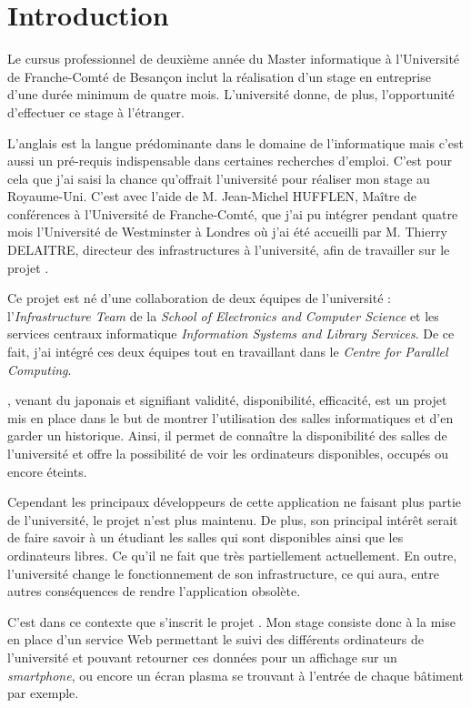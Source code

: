 \chapter{Introduction}

Le cursus professionnel de deuxi\`eme ann\'ee du Master informatique \`a l'Universit\'e de Franche-Comt\'e de Besan\c{c}on inclut la r\'ealisation d'un stage en entreprise d'une dur\'ee minimum de quatre mois. 
L'universit\'e donne, de plus, l'opportunit\'e d'effectuer ce stage \`a l'\'etranger.

L'anglais est la langue pr\'edominante dans le domaine de l'informatique mais c'est aussi un pr\'e-requis indispensable dans certaines recherches d'emploi.
C'est pour cela que j'ai saisi la chance qu'offrait l'universit\'e pour r\'ealiser mon stage au Royaume-Uni. 
C'est avec l'aide de M. Jean-Michel HUFFLEN, Ma\^itre de conf\'erences \`a l'Universit\'e de Franche-Comt\'e, que j'ai pu int\'egrer pendant quatre mois l'Universit\'e de Westminster \`a Londres o\`u j'ai \'et\'e accueilli par M. Thierry DELAITRE, directeur des infrastructures \`a l'universit\'e, afin de travailler sur le projet \YuukouII.

Ce projet est n\'e d'une collaboration de deux \'equipes de l'universit\'e : l'\textit{Infrastructure Team} de la \textit{School of Electronics and Computer Science} et les services centraux informatique \textit{Information Systems and Library Services}. 
De ce fait, j'ai int\'egr\'e ces deux \'equipes tout en travaillant dans le \textit{Centre for Parallel Computing}.

\Yuukou, venant du japonais et signifiant validit\'e, disponibilit\'e, efficacit\'e, est un projet mis en place dans le but de montrer l'utilisation des salles informatiques et d'en garder un historique.
Ainsi, il permet de conna\^itre la disponibilit\'e des salles de l'universit\'e et offre la possibilit\'e de voir les ordinateurs disponibles, occup\'es ou encore \'eteints.

Cependant les principaux d\'eveloppeurs de cette application ne faisant plus partie de l'universit\'e, le projet n'est plus maintenu.
De plus, son principal int\'er\^et serait de faire savoir \`a un \'etudiant les salles qui sont disponibles ainsi que les ordinateurs libres.
Ce qu'il ne fait que tr\`es partiellement actuellement.
En outre, l'universit\'e change le fonctionnement de son infrastructure, ce qui aura, entre autres cons\'equences de rendre l'application obsol\`ete.

C'est dans ce contexte que s'inscrit le projet \YuukouII. 
Mon stage consiste donc \`a la mise en place d'un service Web permettant le suivi des diff\'erents ordinateurs de l'universit\'e et pouvant retourner ces donn\'ees pour un affichage sur un \textit{smartphone}, ou encore un \'ecran plasma se trouvant \`a l'entr\'ee de chaque b\^atiment par exemple.

